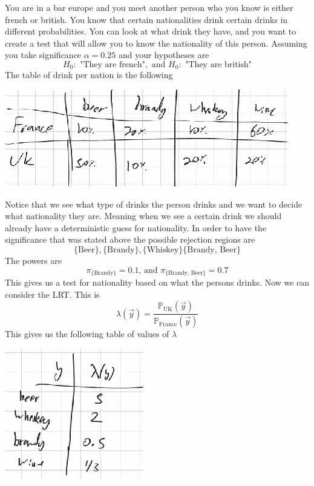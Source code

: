 \documentclass[../main.tex]{subfiles}
\begin{document}
\begin{example}
You are in a bar europe and you meet another person who you know is either french or british. You know that certain nationalities drink certain drinks in different probabilities. You can look at what drink they have, and you want to create a test that will allow you to know the nationality of this person. Assuming you take significance $\alpha=0.25$ and your hypotheses are
\[H_0: \text{ "They are french"}, \text{ and }H_0: \text{ "They are british"}\]
The table of drink per nation is the following
\begin{center}
    \includegraphics{images/Lecture 12 Table.png}
\end{center}
Notice that we see what type of drinks the person drinks and we want to decide what nationality they are. Meaning when we see a certain drink we should already have a deterministic guess for nationality. In order to have the significance that was stated above the possible rejection regions are
\[\{\text{Beer}\}, \{\text{Brandy}\}, \{\text{Whiskey}\}\{\text{Brandy, Beer}\}\]
The powers are
\[\pi_{\{\text{Brandy}\}} = 0.1\text{, and }\pi_{\{\text{Brandy, Beer}\}} = 0.7\]
This gives us a test for nationality based on what the persons drinks. Now we can consider the LRT. This is
\[\lambda(\overrightarrow{y}) = \frac{\mathbb{P}_{\text{UK}}(\overrightarrow{y})}{\mathbb{P}_{\text{France}}(\overrightarrow{y})}\]
This gives us the following table of values of $\lambda$
\begin{center}
    \includegraphics{images/Lambda Values Table.png}

\end{center}
\end{example}
\end{document}
